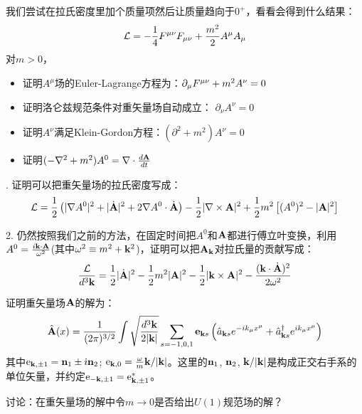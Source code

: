 \documentclass[CJK]{beamer}
\begin{document}
\begin{frame}
\bch
我们尝试在拉氏密度里加个质量项然后让质量趋向于$0^+$，看看会得到什么结果：
$${\mathcal{L}} = -\frac{1}{4}{F^{\mu\nu}}{F_{\mu\nu}} + \frac{m^2}{2} A^\mu A_\mu $$
对$m>0$，
\begin{itemize}
\item{证明$A^\mu$场的Euler-Lagrange方程为：$\partial_\mu {F^{\mu\nu}} + m^2 A^\nu = 0$}
\item{证明洛仑兹规范条件对重矢量场自动成立： $\partial_\nu A^\nu = 0$}
\item{证明$A^\nu$满足Klein-Gordon方程：$(\partial^2 + m^2) A^\nu = 0$}
\item{证明$(-\nabla^2+m^2)A^0 = \nabla \cdot \frac{d{\mathbf{A}}}{dt}$}
\end{itemize}

\ech
\end{frame}

\begin{frame}
. 证明可以把重矢量场的拉氏密度写成：
$${\mathcal{L}} = \frac{1}{2} \left( |\nabla A^0|^2  + |\dot{{\mathbf{A}}}|^2 + 2 \nabla A^0 \cdot \dot{{\mathbf{A}}} \right) - \frac{1}{2}|\nabla \times {\mathbf{A}}|^2 + \frac{1}{2}m^2 \left[(A^0)^2 - |{\mathbf{A}}|^2\right]$$ 

2. 仍然按照我们之前的方法，在固定时间把$A^0$和${\mathbf{A}}$都进行傅立叶变换，利用$A^0 = \frac{i{\mathbf{k}} \cdot {\mathbf{A}}}{\omega^2}$(其中$\omega^2 \equiv m^2 + {\mathbf{k}}^2$)，证明可以把${\mathbf{A}}_{\mathbf{k}}$对拉氏量的贡献写成：
$$\frac{{\mathcal{L}}}{d^3{\mathbf{k}}} = \frac{1}{2}|\dot{{\mathbf{A}}}|^2 - \frac{1}{2}m^2|{\mathbf{A}}|^2- \frac{1}{2}|{\mathbf{k}}\times{\mathbf{A}}|^2 - \frac{({\mathbf{k}}\cdot\dot{{\mathbf{A}}})^2}{2\omega^2}$$

\ech
\end{frame}

\begin{frame}
\bch
证明重矢量场${\mathbf{A}}$的解为：
$$\hat{{\mathbf{A}}}(x) = \frac{1}{(2\pi)^{3/2}} \int \sqrt{\frac{d^3{\mathbf{k}}}{2|{\mathbf{k}}|}} \sum_{s=-1,0,1}\mathbf{e}_{{\mathbf{k}} s}\left({\hat{a}}_{{\mathbf{k}} s} e^{-ik_\mu x^\mu} + {\hat{a}^\dagger}_{{\mathbf{k}} s}e^{ik_\mu x^\mu}\right) $$
其中$\mathrm{e}_{{\mathbf{k}},\pm 1} = {\mathbf{n}}_1 \pm {\dot{\imath}} {\mathbf{n}}_2$; $\mathrm{e}_{{\mathbf{k}}, 0} = \frac{\omega}{m} {\mathbf{k}}/|{\mathbf{k}}|$。这里的${\mathbf{n}}_1$, ${\mathbf{n}}_2$, ${\mathbf{k}}/|{\mathbf{k}}|$是构成正交右手系的单位矢量，并约定$\mathrm{e}_{-{\mathbf{k}}, \pm 1} = \mathrm{e}_{{\mathbf{k}},\pm 1}^*$。 

\skipline

讨论：在重矢量场的解中令$m\rightarrow 0$是否给出$U(1)$规范场的解？
\ech
\end{frame}
\end{document}
